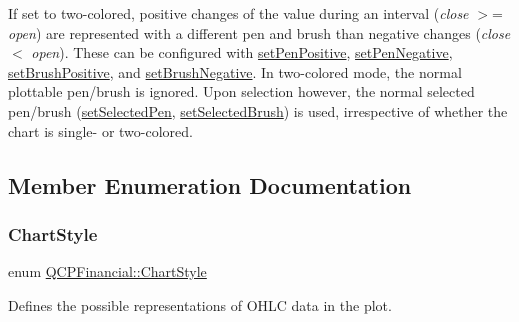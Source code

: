 If set to two-\/colored, positive changes of the value during an interval ({\itshape close} $>$= {\itshape open}) are represented with a different pen and brush than negative changes ({\itshape close} $<$ {\itshape open}). These can be configured with \hyperlink{class_q_c_p_financial_ac58aa3adc7a35aab0088764b840683e5}{set\+Pen\+Positive}, \hyperlink{class_q_c_p_financial_afe5c07e94ccea01a75b3a2476993c346}{set\+Pen\+Negative}, \hyperlink{class_q_c_p_financial_a5ebff2b1764efd07cc44942e67821829}{set\+Brush\+Positive}, and \hyperlink{class_q_c_p_financial_a8bbdd87629f9144b3ef51af660c0961a}{set\+Brush\+Negative}. In two-\/colored mode, the normal plottable pen/brush is ignored. Upon selection however, the normal selected pen/brush (\hyperlink{class_q_c_p_abstract_plottable_a6911603cad23ab0469b108224517516f}{set\+Selected\+Pen}, \hyperlink{class_q_c_p_abstract_plottable_ae8c816874089f7a44001e8618e81a9dc}{set\+Selected\+Brush}) is used, irrespective of whether the chart is single-\/ or two-\/colored. 

\subsection{Member Enumeration Documentation}
\hypertarget{class_q_c_p_financial_a0f800e21ee98d646dfc6f8f89d10ebfb}{}\label{class_q_c_p_financial_a0f800e21ee98d646dfc6f8f89d10ebfb} 
\subsubsection{\texorpdfstring{Chart\+Style}{ChartStyle}}
{\footnotesize\ttfamily enum \hyperlink{class_q_c_p_financial_a0f800e21ee98d646dfc6f8f89d10ebfb}{Q\+C\+P\+Financial\+::\+Chart\+Style}}

Defines the possible representations of O\+H\+LC data in the plot.

